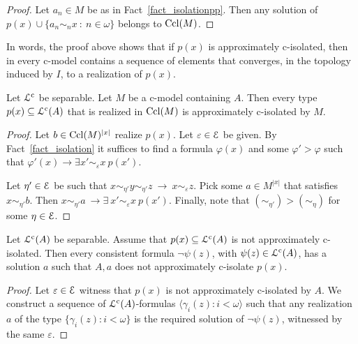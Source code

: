 \documentclass{amsproc}
\begin{document}
{\begin{proof}
  Let $a_n\in M$ be as in Fact~\ref{fact_isolationpp}.
  Then any solution of $p(x)\cup\big\{a_n\sim_nx\ :\ n\in\omega\big\}$ belongs to ${\rm Ccl}(M)$.
\end{proof}

In words, the proof above shows that if $p(x)$ is approximately c-isolated, then in every c-model contains a sequence of elements that converges, in the topology induced by $I$, to a realization of $p(x)$.

\begin{fact}\label{fact_wcisolatio_realization}
  Let ${\EuScript L}^{\rm c}$ be separable.
  Let $M$ be a c-model containing $A$.
  Then every type $p(x)\subseteq{\EuScript L}^{\rm c}(A)$ that is realized in ${\rm Ccl}(M)$ is approximately c-isolated by $M$.
\end{fact}

\begin{proof}
  Let $b\in{\rm Ccl}(M)^{|x|}$ realize $p(x)$.
  Let $\varepsilon\in{\EuScript E}$ be given.
  By Fact~\ref{fact_isolation} it suffices to find a formula $\varphi(x)$ and some $\varphi'>\varphi$ such that $\varphi'(x)\rightarrow\exists x'\sim_\varepsilon x\ p(x')$.

  Let $\eta'\in{\EuScript E}$ be such that $x\sim_{\eta'} y\sim_{\eta'} z\ \rightarrow\ x\sim_\varepsilon z$.
  Pick some $a\in M^{|x|}$ that satisfies $x\sim_{\eta'} b$.
  Then $x\sim_{\eta'}a\ \rightarrow\exists\ x'\sim_\varepsilon x\ p(x')$.
  Finally, note that $(\sim_{\eta'})>(\sim_\eta)$ for some $\eta\in{\EuScript E}$.
\end{proof}

\begin{lemma}\label{lem_kuratowskiUlam_cont}
  Let ${\EuScript L}^{\rm c}(A)$ be separable.
  Assume that $p(x)\subseteq{\EuScript L}^{\rm c}(A)$ is not approximately c-isolated.
  Then every consistent formula $\neg\psi(z)$, with $\psi(z)\in{\EuScript L}^{\rm c}(A)$, has a solution $a$ such that $A,a$ does not approximately c-isolate $p(x)$.
\end{lemma}

\begin{proof}
  Let $\varepsilon\in{\EuScript E}$ witness that $p(x)$ is not approximately c-isolated by $A$. 
  We construct a sequence of ${\EuScript L}^{\rm c}(A)$-formulas $\langle\gamma_i(z):i<\omega\rangle$ such that any realization $a$ of the type $\big\{\gamma_i(z):i<\omega\big\}$ is the required solution of $\neg\psi(z)$, witnessed by the same $\varepsilon$.
  

\end{proof}}
\end{document}

